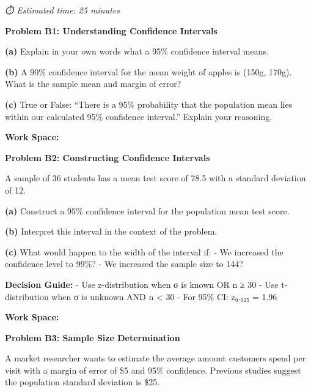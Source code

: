 \documentclass[
  11pt,
]{article}
\begin{document}
\emph{⏱️ Estimated time: 25 minutes}

\textbf{Problem B1: Understanding Confidence Intervals}

\textbf{(a)} Explain in your own words what a 95\% confidence interval
means.

\textbf{(b)} A 90\% confidence interval for the mean weight of apples is
(150g, 170g). What is the sample mean and margin of error?

\textbf{(c)} True or False: ``There is a 95\% probability that the
population mean lies within our calculated 95\% confidence interval.''
Explain your reasoning.

\textbf{Work Space:}

\textbf{Problem B2: Constructing Confidence Intervals}

A sample of 36 students has a mean test score of 78.5 with a standard
deviation of 12.

\textbf{(a)} Construct a 95\% confidence interval for the population
mean test score.

\textbf{(b)} Interpret this interval in the context of the problem.

\textbf{(c)} What would happen to the width of the interval if: - We
increased the confidence level to 99\%? - We increased the sample size
to 144?

\begin{tcolorbox}[enhanced jigsaw, colback=white, breakable, title=\textcolor{quarto-callout-tip-color}{\faLightbulb}\hspace{0.5em}{Tip}, rightrule=.15mm, titlerule=0mm, opacitybacktitle=0.6, bottomrule=.15mm, colbacktitle=quarto-callout-tip-color!10!white, toptitle=1mm, opacityback=0, left=2mm, leftrule=.75mm, bottomtitle=1mm, toprule=.15mm, colframe=quarto-callout-tip-color-frame, coltitle=black, arc=.35mm]

\textbf{Decision Guide:} - Use z-distribution when σ is known OR n ≥ 30
- Use t-distribution when σ is unknown AND n \textless{} 30 - For 95\%
CI: z₀.₀₂₅ = 1.96

\end{tcolorbox}

\textbf{Work Space:}

\textbf{Problem B3: Sample Size Determination}

A market researcher wants to estimate the average amount customers spend
per visit with a margin of error of \$5 and 95\% confidence. Previous
studies suggest the population standard deviation is \$25.
\end{document}
